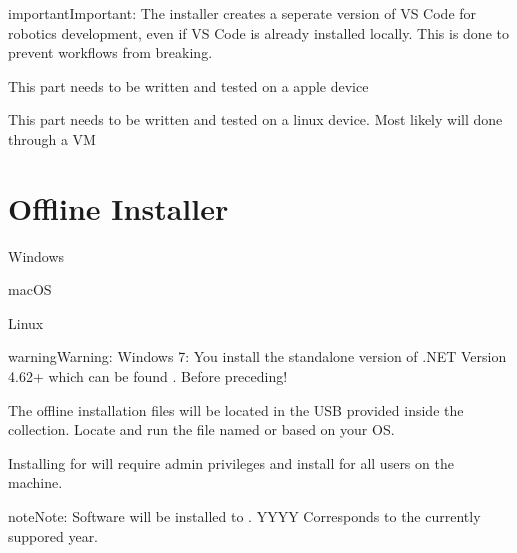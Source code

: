 \documentclass[letterpaper,10pt,english]{sphinxmanual}
\begin{document}
\begin{sphinxadmonition}{important}{Important:}
The installer creates a seperate version of VS Code for robotics development, even if VS Code is already installed locally. This is done to prevent workflows from breaking.
\end{sphinxadmonition}

This part needs to be written and tested on a apple device

This part needs to be written and tested on a linux device. Most likely will done through a VM


\section{Offline Installer}
\label{\detokenize{docs/WorldSkills/setup:offline-installer}}
Windows

macOS

Linux

\begin{sphinxadmonition}{warning}{Warning:}
Windows 7: You  install the standalone version of .NET Version 4.62+ which can be found . Before preceding!
\end{sphinxadmonition}

The offline installation files will be located in the USB provided inside the collection. Locate and run the file named  or  based on your OS.


Installing for  will require admin privileges and install for all users on the machine.

\begin{sphinxadmonition}{note}{Note:}
Software will be installed to . YYYY Corresponds to the currently suppored year.
\end{sphinxadmonition}
\end{document}

